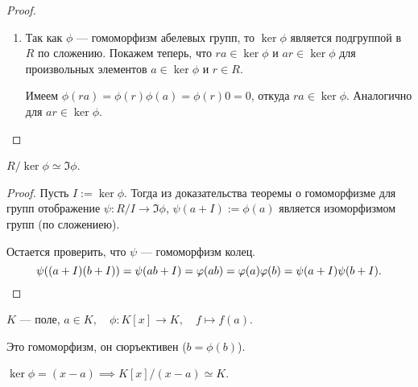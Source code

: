 \begin{proof}~
    \begin{enumerate}
    \item 
        Так как $\phi$ --- гомоморфизм абелевых групп, то $\ker \phi$ является подгруппой в $R$ по сложению. Покажем теперь, что $ra \in \ker \phi$ и $ar \in \ker \phi$ для произвольных элементов $a \in \ker \phi$ и $r \in R$.

        Имеем $\phi(ra) = \phi(r)\phi(a) = \phi(r) 0 = 0$, откуда $ra \in \ker \phi$. Аналогично для $ar \in \ker \phi$.
        \qedhere
    \end{enumerate}
\end{proof}

\begin{theorem}
    $R / \ker \phi \simeq \Im \phi$.
\end{theorem}

\begin{proof}
    Пусть $I := \ker \phi$. Тогда из доказательства теоремы о гомоморфизме для групп отображение $\psi \colon R / I \to \Im \phi$, $\psi(a + I) := \phi(a)$ является изоморфизмом групп (по сложениею).

    Остается проверить, что $\psi$ --- гомоморфизм колец.
    \begin{equation*}
        \psi((a + I)(b + I)) = \psi(ab + I) = \phi(ab) = \phi(a)\phi(b) = \psi(a + I) \psi(b + I)
    .\qedhere\end{equation*}
\end{proof}

\begin{example}
    $K$ --- поле, $a \in K, \quad \phi \colon K[x] \to K, \quad f \mapsto f(a)$.

    Это гомоморфизм, он сюръективен ($b = \phi(b)$).

    $\ker \phi = (x - a) \implies K[x] / (x - a) \simeq K$.
\end{example}
